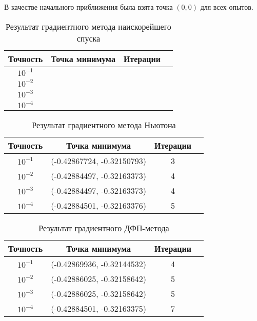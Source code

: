 \documentclass[../body.tex]{subfiles}
\begin{document}
В качестве начального приближения была взята точка $(0,0)$ для всех опытов.
\begin{table}[H]
    \centering
    \begin{tabular}{|c|c|c|c|}
        \hline
        Точность & Точка минимума & Итерации\\\hline
        $10^{-1}$ & &\\\hline
        $10^{-2}$ & &\\\hline
        $10^{-3}$ & &\\\hline
        $10^{-4}$ & &\\\hline
    \end{tabular}
    \caption{Результат градиентного метода наискорейшего спуска}
\end{table}

\begin{table}[H]
    \centering
    \begin{tabular}{|c|c|c|c|}
        \hline
        Точность & Точка минимума & Итерации\\\hline
        $10^{-1}$ & (-0.42867724, -0.32150793) & 3\\\hline
        $10^{-2}$ & (-0.42884497, -0.32163373) & 4\\\hline
        $10^{-3}$ & (-0.42884497, -0.32163373) & 4\\\hline
        $10^{-4}$ & (-0.42884501, -0.32163376) & 5\\\hline
    \end{tabular}
    \caption{Результат градиентного метода Ньютона}
\end{table}

\begin{table}[H]
    \centering
    \begin{tabular}{|c|c|c|c|}
        \hline
        Точность & Точка минимума & Итерации\\\hline
        $10^{-1}$ & (-0.42869936, -0.32144532) & 4\\\hline
        $10^{-2}$ & (-0.42886025, -0.32158642) & 5\\\hline
        $10^{-3}$ & (-0.42886025, -0.32158642) & 5\\\hline
        $10^{-4}$ & (-0.42884501, -0.32163375) & 7\\\hline
    \end{tabular}
    \caption{Результат градиентного ДФП-метода}
\end{table}
\end{document}
